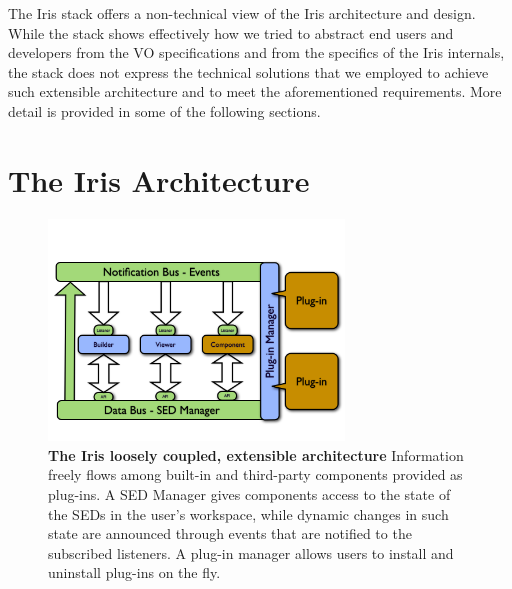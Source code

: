 \documentclass[final,5p,authoryear]{elsarticle}
\begin{document}
The Iris stack offers a non-technical view of the Iris architecture and design.
While the stack shows effectively how we tried to abstract end users and developers
from the VO specifications and from the specifics of the Iris internals, the stack does
not express the technical solutions that we employed to achieve such extensible
architecture and to meet the aforementioned requirements. More detail is
provided in some of the following sections.

\section{The Iris Architecture} \label{sec:architecture}

\begin{figure} \begin{center}
\includegraphics[width=0.7\textwidth]{figures/IrisDiagrams.001.png}
\caption{\textbf{The Iris loosely coupled, extensible architecture} Information
freely flows among built-in and third-party components provided as plug-ins. A
SED Manager gives components access to the state of the SEDs in the user's
workspace, while dynamic changes in such state are announced through events that
are notified to the subscribed listeners. A plug-in manager allows users to
install and uninstall plug-ins on the fly.} \label{fig:architecture}
\end{center} \end{figure}
\end{document}
